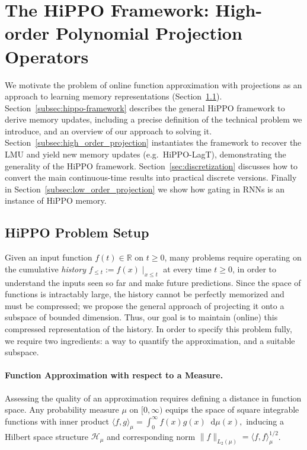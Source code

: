 \documentclass{article}
\renewcommand{\d}{\mathop{}\!\mathrm{d}}
\begin{document}
 

\section{The HiPPO Framework: High-order Polynomial Projection Operators}
\label{sec:framework}

We motivate the problem of online function approximation with projections
as an approach to learning memory representations
(Section~\ref{subsec:hippo-setup}).
Section~\ref{subsec:hippo-framework} describes the general
HiPPO framework to derive memory updates, including a precise definition of the technical problem 
we introduce, and an overview of our approach to solving it.
Section~\ref{subsec:high_order_projection} instantiates the framework to recover
the LMU and yield new memory updates (e.g.\ HiPPO-LagT), demonstrating the generality
of the HiPPO framework.
Section~\ref{sec:discretization} discusses how to convert the main continuous-time results into practical discrete versions.
Finally in Section~\ref{subsec:low_order_projection} we show how gating
in RNNs is an instance of HiPPO memory.


\subsection{HiPPO Problem Setup}
\label{subsec:hippo-setup}





Given an input function $f(t) \in \mathbb{R}$ on $t \ge 0$, many problems require operating on the cumulative \emph{history} $f_{\le t} := f(x) \mid_{x \le t}$ at every time $t \ge 0$,
in order to understand the inputs seen so far and make future predictions.
Since the space of functions is intractably large, the history cannot be perfectly memorized and must be compressed; we propose the general approach of projecting it onto a subspace of bounded dimension.
Thus, our goal is to maintain (online) this compressed representation of the history.
In order to specify this problem fully, we require two ingredients: a way to quantify the approximation, and a suitable subspace.


\paragraph{Function Approximation with respect to a Measure.}
Assessing the quality of an approximation requires defining a distance in function space.
Any probability measure $\mu$ on $[0, \infty)$ equips the space of square integrable functions with inner product
$
  \langle f, g \rangle_\mu = \int_0^\infty f(x) g(x) \d \mu(x),
$
inducing a Hilbert space structure $\mathcal{H}_\mu$ and corresponding norm $\| f \|_{L_2(\mu)} = \langle f, f \rangle_\mu^{1/2}$.
\end{document}
